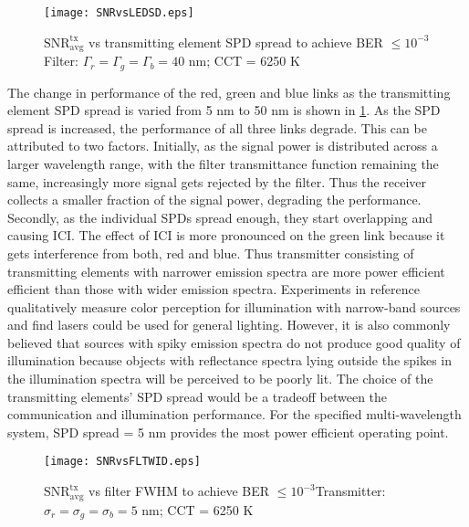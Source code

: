\begin{figure}[!t]
	\centering
		\texttt{[image: SNRvsLEDSD.eps]}
	\caption[SNR vs transmitter SPD spread for multi--color system]{$\text{SNR}^{\text{tx}}_{\text{avg}}$ vs transmitting element SPD spread to achieve BER $\leq 10^{-3}$\newline Filter: $\Gamma_r = \Gamma_g = \Gamma_b = 40$ nm; CCT = 6250 K}
	\label{fig:SNRvsLEDSD}
\end{figure}

The change in performance of the red, green and blue links as the transmitting element SPD spread is varied from 5 nm to 50 nm is shown in \figurename{ \ref{fig:SNRvsLEDSD}}. As the SPD spread is increased, the performance of all three links degrade. This can be attributed to two factors. Initially, as the signal power is distributed across a larger wavelength range, with the filter transmittance function remaining the same, increasingly more signal gets rejected by the filter. Thus the receiver collects a smaller fraction of the signal power, degrading the performance. Secondly, as the individual SPDs spread enough, they start overlapping and causing ICI. The effect of ICI is more pronounced on the green link because it gets interference from both, red and blue. Thus transmitter consisting of transmitting elements with narrower emission spectra are more power efficient efficient than those with wider emission spectra. Experiments in reference \cite{neu11a} qualitatively measure color perception for illumination with narrow-band sources and find lasers could be used for general lighting. However, it is also commonly believed that sources with spiky emission spectra do not produce good quality of illumination because objects with reflectance spectra lying outside the spikes in the illumination spectra will be perceived to be poorly lit. The choice of the transmitting elements' SPD spread would be a tradeoff between the communication and illumination performance. For the specified multi-wavelength system, SPD spread = 5 nm provides the most power efficient operating point.

\begin{figure}[!t]
	\centering
		\texttt{[image: SNRvsFLTWID.eps]}
	\caption[SNR vs filter FWHM for multi--color system]{$\text{SNR}^{\text{tx}}_{\text{avg}}$ vs filter FWHM to achieve BER $\leq 10^{-3}$\newline Transmitter: $\sigma_r = \sigma_g = \sigma_b = 5$ nm; CCT = 6250 K}
	\label{fig:SNRvsFLTWID}
\end{figure}

